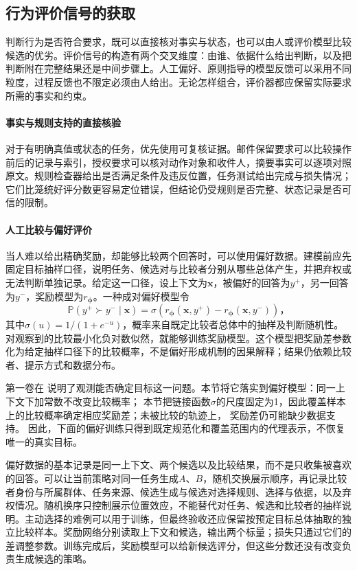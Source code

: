 \subsection{行为评价信号的获取}
\label{sec:alignment-learning-evaluation}

判断行为是否符合要求，既可以直接核对事实与状态，也可以由人或评价模型比较候选的优劣。评价信号的构造有两个交叉维度：由谁、依据什么给出判断，以及把判断附在完整结果还是中间步骤上。人工偏好、原则指导的模型反馈可以采用不同粒度，过程反馈也不限定必须由人给出。无论怎样组合，评价器都应保留实际要求所需的事实和约束。

\paragraph{事实与规则支持的直接核验}

对于有明确真值或状态的任务，优先使用可复核证据。邮件保留要求可以比较操作前后的记录与索引，授权要求可以核对动作对象和收件人，摘要事实可以逐项对照原文。规则检查器给出是否满足条件及违反位置，任务测试给出完成与损失情况；它们比笼统好评分数更容易定位错误，但结论仍受规则是否完整、状态记录是否可信的限制。

\paragraph{人工比较与偏好评价}

当人难以给出精确奖励，却能够比较两个回答时，可以使用偏好数据。建模前应先固定目标抽样口径，说明任务、候选对与比较者分别从哪些总体产生，并把弃权或无法判断单独记录。给定这一口径，设上下文为$\bm{x}$，被偏好的回答为$y^+$，另一回答为$y^-$，奖励模型为$r_{\bm{\phi}}$。一种成对偏好模型令
\[
 \mathbb P(y^+\succ y^-\mid\bm{x})
 =\sigma\!\left(r_{\bm{\phi}}(\bm{x},y^+)
              -r_{\bm{\phi}}(\bm{x},y^-)\right)\text{，}
\]
其中$\sigma(u)=1/(1+e^{-u})$，概率来自既定比较者总体中的抽样及判断随机性。对观察到的比较最小化负对数似然，就能够训练奖励模型。这个模型把奖励差参数化为给定抽样口径下的比较概率，不是偏好形成机制的因果解释；结果仍依赖比较者、提示方式和数据分布。

第一卷在
说明了观测能否确定目标这一问题。本节将它落实到偏好模型：同一上下文下加常数不改变比较概率；
本节把链接函数$\sigma$的尺度固定为1，因此覆盖样本上的比较概率确定相应奖励差；未被比较的轨迹上，
奖励差仍可能缺少数据支持。
因此，下面的偏好训练只得到既定规范化和覆盖范围内的代理表示，不恢复唯一的真实目标。

偏好数据的基本记录是同一上下文、两个候选以及比较结果，而不是只收集被喜欢的回答。可以让当前策略对同一任务生成$A$、$B$，随机交换展示顺序，再记录比较者身份与所属群体、任务来源、候选生成与候选对选择规则、选择与依据，以及弃权情况。随机换序只控制展示位置效应，不能替代对任务、候选和比较者的抽样说明。主动选择的难例可以用于训练，但最终验收还应保留按预定目标总体抽取的独立比较样本。奖励网络分别读取上下文和候选，输出两个标量；损失只通过它们的差调整参数。训练完成后，奖励模型可以给新候选评分，但这些分数还没有改变负责生成候选的策略。

